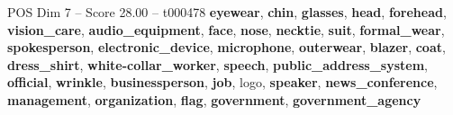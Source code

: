\begin{textsample}{POS Dim 7 – Score 28.00 – t000478}  \label{ex:f7_pos_015}
\textbf{eyewear}, \textbf{chin}, \textbf{glasses}, \textbf{head}, \textbf{forehead}, \textbf{vision\_care}, \textbf{audio\_equipment}, \textbf{face}, \textbf{nose}, \textbf{necktie}, \textbf{suit}, \textbf{formal\_wear}, \textbf{spokesperson}, \textbf{electronic\_device}, \textbf{microphone}, \textbf{outerwear}, \textbf{blazer}, \textbf{coat}, \textbf{dress\_shirt}, \textbf{white-collar\_worker}, \textbf{speech}, \textbf{public\_address\_system}, \textbf{official}, \textbf{wrinkle}, \textbf{businessperson}, \textbf{job}, logo, \textbf{speaker}, \textbf{news\_conference}, \textbf{management}, \textbf{organization}, \textbf{flag}, \textbf{government}, \textbf{government\_agency}

\end{textsample}
